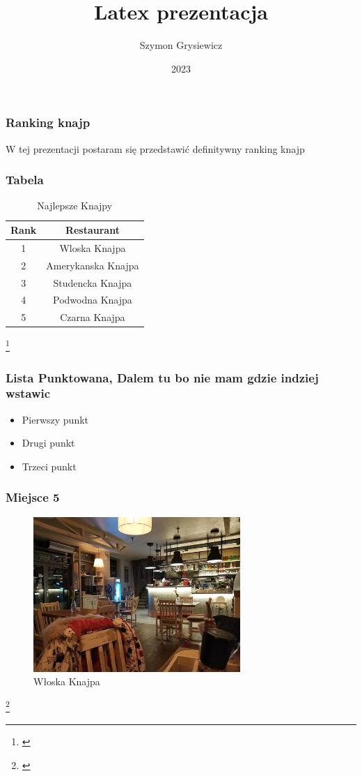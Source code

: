 \documentclass{beamer}
\title{Latex prezentacja}
\author{Szymon Grysiewicz}
\institute{UG}
\date{2023}
\begin{document}
\frame{\titlepage}

\begin{frame}
\frametitle{Ranking knajp}
W tej prezentacji postaram się przedstawić definitywny ranking knajp
\end{frame}

\begin{frame}
\frametitle{Tabela}
    \begin{table}
        \centering
        \begin{tabular}{|c|c|}
            \hline
            \textbf{Rank} & \textbf{Restaurant} \\
            \hline
            1 & Wloska Knajpa\\
            2 & Amerykanska Knajpa \\
            3 & Studencka Knajpa \\
            4 & Podwodna Knajpa \\
            5 & Czarna Knajpa \\
            \hline
        \end{tabular}
        \caption{Najlepsze Knajpy}
    \end{table}
    \footnote{\cite{tabela}}
\end{frame}

\begin{frame}
    \frametitle{Lista Punktowana, Dalem tu bo nie mam gdzie indziej wstawic}
    \begin{itemize}
        \item Pierwszy punkt
        \item Drugi punkt
        \item Trzeci punkt
    \end{itemize}
    \end{frame}


\begin{frame}
    \frametitle{Miejsce 5}
        \begin{figure}
            \includegraphics[width=0.7\textwidth]{pepe.jpg}
            \caption{Włoska Knajpa}
        \end{figure}
        \footnote{\cite{knajpa1}}
\end{frame}
    
\end{document}
